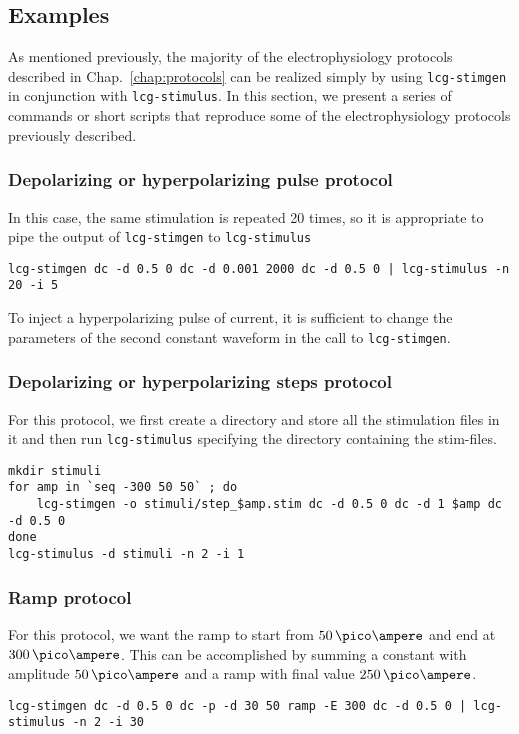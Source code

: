 \subsection{Examples}
As mentioned previously, the majority of the electrophysiology
protocols described in Chap.~\ref{chap:protocols} can be realized
simply by using \verb+lcg-stimgen+ in conjunction with
\verb+lcg-stimulus+. In this section, we present a series of
commands or short scripts that reproduce some of the electrophysiology
protocols previously described.

\subsubsection{Depolarizing or hyperpolarizing pulse protocol}
In this case, the same stimulation is repeated 20 times, so it is
appropriate to pipe the output of \verb+lcg-stimgen+ to \verb+lcg-stimulus+
\begin{lstlisting}
lcg-stimgen dc -d 0.5 0 dc -d 0.001 2000 dc -d 0.5 0 | lcg-stimulus -n 20 -i 5
\end{lstlisting}
To inject a hyperpolarizing pulse of current, it is sufficient to
change the parameters of the second constant waveform in the call to
\verb+lcg-stimgen+.

\subsubsection{Depolarizing or hyperpolarizing steps protocol}
For this protocol, we first create a directory and store all the
stimulation files in it and then run \verb+lcg-stimulus+ specifying the
directory containing the stim-files.
\begin{lstlisting}
mkdir stimuli
for amp in `seq -300 50 50` ; do
    lcg-stimgen -o stimuli/step_$amp.stim dc -d 0.5 0 dc -d 1 $amp dc -d 0.5 0
done
lcg-stimulus -d stimuli -n 2 -i 1
\end{lstlisting}

\subsubsection{Ramp protocol}
For this protocol, we want the ramp to start from $50\,\pico\ampere$
and end at $300\,\pico\ampere$. This can be accomplished by summing a
constant with amplitude $50\,\pico\ampere$ and a ramp with final value
$250\,\pico\ampere$.
\begin{lstlisting}
lcg-stimgen dc -d 0.5 0 dc -p -d 30 50 ramp -E 300 dc -d 0.5 0 | lcg-stimulus -n 2 -i 30
\end{lstlisting}

